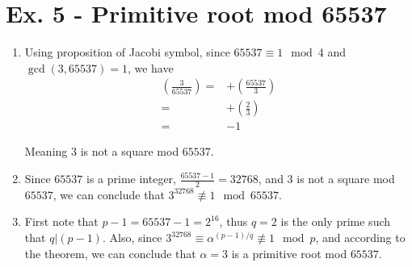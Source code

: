 \documentclass[11pt,a4paper]{article}
\begin{document}
\section*{Ex. 5 - Primitive root mod 65537}
\begin{enumerate}
\item Using proposition of Jacobi symbol, since $65537 \equiv 1 \mod 4$ and $\gcd(3, 65537) = 1$, we have
\begin{align*}
	\left(\frac{3}{65537}\right) =& + \left(\frac{65537}{3}\right) \\
	=& + \left(\frac{2}{3}\right) \\
	=& - 1
\end{align*}
\par Meaning $3$ is not a square mod $65537$.

\item Since $65537$ is a prime integer, $\frac{65537-1}{2} = 32768$, and $3$ is not a square mod $65537$, we can conclude that $3^{32768}\not\equiv 1 \mod 65537$.

\item First note that $p-1=65537-1 = 2^{16}$, thus $q=2$ is the only prime such that $q \vert (p-1)$. Also, since $3^{32768}\equiv \alpha^{(p-1)/q} \not\equiv 1 \mod p$, and according to the theorem, we can conclude that $\alpha = 3$ is a primitive root mod $65537$.
\end{enumerate}
\end{document}
